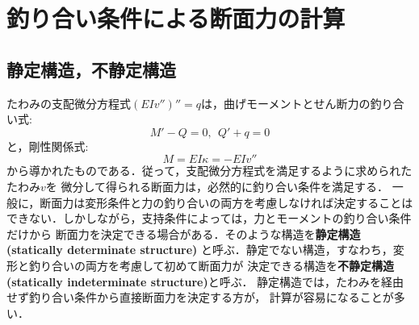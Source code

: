 \documentclass[10pt,a4j]{jbook}
\newlength{\minitwocolumn}
\begin{document}
\newcommand{\fat}[1]{\mbox{\boldmath $#1$}}
\newcommand{\D}{\partial}
\newcommand{\w}{\omega}
\newcommand{\ga}{\alpha}
\newcommand{\gb}{\beta}
\newcommand{\gx}{\xi}
\newcommand{\gz}{\zeta}
\newcommand{\vhat}[1]{\hat{\fat{#1}}}
\newcommand{\spc}{\vspace{0.7\baselineskip}}
\newcommand{\halfspc}{\vspace{0.3\baselineskip}}

\newcommand{\twofig}[2]
 {
   \begin{figure}
     \begin{minipage}[t]{\minitwocolumn}
         \begin{center}   #1
         \end{center}
     \end{minipage}
         \hspace{\columnsep}
     \begin{minipage}[t]{\minitwocolumn}
         \begin{center} #2
         \end{center}
     \end{minipage}
   \end{figure}
 }
\setcounter{chapter}{5}
\chapter{釣り合い条件による断面力の計算}
\section{静定構造，不静定構造}
たわみの支配微分方程式$(EIv'')''=q$は，曲げモーメントとせん断力の釣り合い式:
\begin{equation}
	M'-Q=0, \ \ Q'+q=0 
	\label{eqn:equiv_MQ}
\end{equation}
と，剛性関係式:
\begin{equation}
	M=EI\kappa = -EIv''
	\label{eqn:M_kpp}
\end{equation}
から導かれたものである．従って，支配微分方程式を満足するように求められたたわみ$v$を
微分して得られる断面力は，必然的に釣り合い条件を満足する．
一般に，断面力は変形条件と力の釣り合いの両方を考慮しなければ決定することは
できない．しかしながら，支持条件によっては，力とモーメントの釣り合い条件だけから
断面力を決定できる場合がある．そのような構造を{\bf 静定構造(statically determinate structure)
}と呼ぶ．静定でない構造，すなわち，変形と釣り合いの両方を考慮して初めて断面力が
決定できる構造を{\bf 不静定構造(statically indeterminate structure)}と呼ぶ．
静定構造では，たわみを経由せず釣り合い条件から直接断面力を決定する方が，
計算が容易になることが多い．
\end{document}
